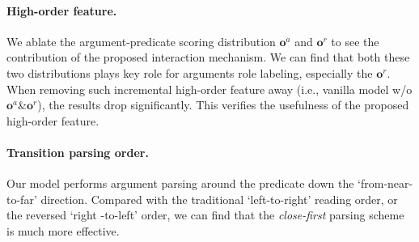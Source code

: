 \documentclass[letterpaper]{article} \usepackage{aaai21}  \usepackage{times}  \usepackage{helvet} \usepackage{courier}  \usepackage[hyphens]{url}  \usepackage{graphicx} \urlstyle{rm} \def\UrlFont{\rm}  \usepackage{natbib}  \usepackage{caption}
\begin{document}
\begin{CJK}{UTF8}{gbsn}
\paragraph{High-order feature.}
We ablate the argument-predicate scoring distribution $\bm{o}^a$ and $\bm{o}^r$ to see the contribution of the proposed interaction mechanism.
We can find that both these two distributions plays key role for arguments role labeling, especially the $\bm{o}^r$.
When removing such incremental high-order feature away (i.e., vanilla model w/o $\bm{o}^a$\&$\bm{o}^r$), the results drop significantly.
This verifies the usefulness of the proposed high-order feature.


\paragraph{Transition parsing order.}
Our model performs argument parsing around the predicate down the `from-near-to-far' direction.
Compared with the traditional `left-to-right' reading order, or the reversed `right -to-left' order, we can find that the \emph{close-first} parsing scheme is much more effective.










\begin{table*}[!t]
\begin{center}
\end{center}
\caption{
End-to-end SRL on UPB data.
Values are F1 scores for argument recognition and role labeling.
}
\label{UPB}
\end{table*}











\end{CJK}
\end{document}
